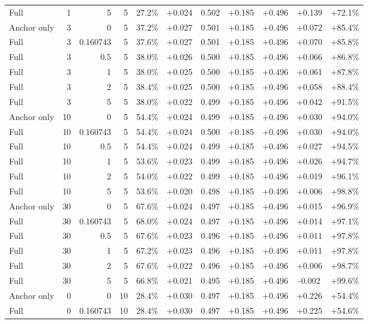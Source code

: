 \begin{table}[htbp]
\begin{tabular}{lrrrccccccc}
Full & 1 & 5 & 5 & 27.2\% & +0.024 & 0.502 & +0.185 & +0.496 & +0.139 & +72.1\% \\
Anchor only & 3 & 0 & 5 & 37.2\% & +0.027 & 0.501 & +0.185 & +0.496 & +0.072 & +85.4\% \\
Full & 3 & 0.160743 & 5 & 37.6\% & +0.027 & 0.501 & +0.185 & +0.496 & +0.070 & +85.8\% \\
Full & 3 & 0.5 & 5 & 38.0\% & +0.026 & 0.500 & +0.185 & +0.496 & +0.066 & +86.8\% \\
Full & 3 & 1 & 5 & 38.0\% & +0.025 & 0.500 & +0.185 & +0.496 & +0.061 & +87.8\% \\
Full & 3 & 2 & 5 & 38.4\% & +0.025 & 0.500 & +0.185 & +0.496 & +0.058 & +88.4\% \\
Full & 3 & 5 & 5 & 38.0\% & +0.022 & 0.499 & +0.185 & +0.496 & +0.042 & +91.5\% \\
Anchor only & 10 & 0 & 5 & 54.4\% & +0.024 & 0.499 & +0.185 & +0.496 & +0.030 & +94.0\% \\
Full & 10 & 0.160743 & 5 & 54.4\% & +0.024 & 0.500 & +0.185 & +0.496 & +0.030 & +94.0\% \\
Full & 10 & 0.5 & 5 & 54.4\% & +0.024 & 0.499 & +0.185 & +0.496 & +0.027 & +94.5\% \\
Full & 10 & 1 & 5 & 53.6\% & +0.023 & 0.499 & +0.185 & +0.496 & +0.026 & +94.7\% \\
Full & 10 & 2 & 5 & 54.0\% & +0.022 & 0.499 & +0.185 & +0.496 & +0.019 & +96.1\% \\
Full & 10 & 5 & 5 & 53.6\% & +0.020 & 0.498 & +0.185 & +0.496 & +0.006 & +98.8\% \\
Anchor only & 30 & 0 & 5 & 67.6\% & +0.024 & 0.497 & +0.185 & +0.496 & +0.015 & +96.9\% \\
Full & 30 & 0.160743 & 5 & 68.0\% & +0.024 & 0.497 & +0.185 & +0.496 & +0.014 & +97.1\% \\
Full & 30 & 0.5 & 5 & 67.6\% & +0.023 & 0.496 & +0.185 & +0.496 & +0.011 & +97.8\% \\
Full & 30 & 1 & 5 & 67.2\% & +0.023 & 0.496 & +0.185 & +0.496 & +0.011 & +97.8\% \\
Full & 30 & 2 & 5 & 67.6\% & +0.022 & 0.496 & +0.185 & +0.496 & +0.006 & +98.7\% \\
Full & 30 & 5 & 5 & 66.8\% & +0.021 & 0.495 & +0.185 & +0.496 & -0.002 & +99.6\% \\
Anchor only & 0 & 0 & 10 & 28.4\% & +0.030 & 0.497 & +0.185 & +0.496 & +0.226 & +54.4\% \\
Full & 0 & 0.160743 & 10 & 28.4\% & +0.030 & 0.497 & +0.185 & +0.496 & +0.225 & +54.6\% \\

\end{tabular}
\end{table}
